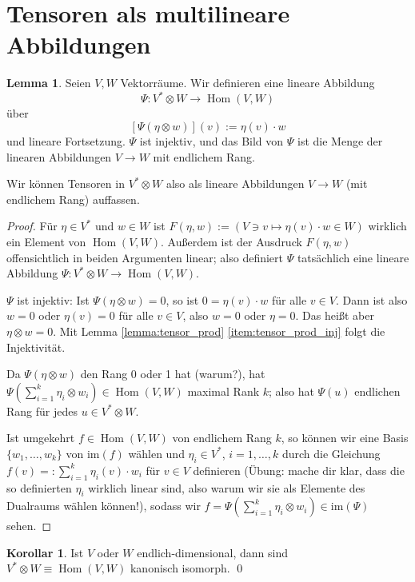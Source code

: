 \documentclass[a4paper]{scrbook}
\numberwithin{equation}{chapter}
\DeclareMathOperator{\Hom}{Hom}
\theoremstyle{definition}
\newtheorem{lemma}[defn]{Lemma}
\newtheorem{kor}[defn]{Korollar}
\begin{document}
\section{Tensoren als multilineare Abbildungen}

\begin{lemma}
	Seien $V,W$ Vektorräume. Wir definieren eine lineare Abbildung
	\[\Psi\colon V^*\otimes W \to \Hom(V,W)\]
	über
	\[[\Psi(\eta\otimes w)](v) := \eta(v) \cdot w\]
	und lineare Fortsetzung. $\Psi$ ist injektiv, und das Bild von $\Psi$ ist die Menge der linearen Abbildungen $V\to W$ mit endlichem Rang.

	Wir können Tensoren in $V^*\otimes W$ also als lineare Abbildungen $V\to W$ (mit endlichem Rang) auffassen.

	\begin{proof}
		Für $\eta \in V^*$ und $w\in W$ ist $F(\eta,w) := (V \ni v \mapsto \eta(v) \cdot w \in W)$ wirklich ein Element von $\Hom(V,W)$. Außerdem ist der Ausdruck $F(\eta,w)$ offensichtlich in beiden Argumenten linear; also definiert $\Psi$ tatsächlich eine lineare Abbildung $\Psi\colon V^*\otimes W \to \Hom(V,W)$.

		$\Psi$ ist injektiv: Ist $\Psi(\eta \otimes w) = 0$, so ist $0 = \eta(v) \cdot w$ für alle $v\in V$. Dann ist also $w=0$ oder $\eta(v) = 0$ für alle $v\in V$, also $w=0$ oder $\eta=0$. Das heißt aber $\eta \otimes w = 0$. Mit Lemma \ref{lemma:tensor_prod} \ref{item:tensor_prod_inj} folgt die Injektivität.

		Da $\Psi(\eta\otimes w)$ den Rang 0 oder 1 hat (warum?), hat $\Psi\left(\sum_{i=1}^k \eta_i \otimes w_i\right) \in \Hom(V,W)$ maximal Rank $k$; also hat $\Psi(u)$ endlichen Rang für jedes $u\in V^*\otimes W$.

		Ist umgekehrt $f\in\Hom(V,W)$ von endlichem Rang $k$, so können wir eine Basis $\{w_1,\dots,w_k\}$ von $\mathrm{im}(f)$ wählen und $\eta_i \in V^*$, $i=1,\dots,k$ durch die Gleichung $f(v) =: \sum_{i=1}^k \eta_i(v) \cdot w_i$ für $v\in V$ definieren (Übung: mache dir klar, dass die so definierten $\eta_i$ wirklich linear sind, also warum wir sie als Elemente des Dualraums wählen können!), sodass wir $f = \Psi\left(\sum_{i=1}^k \eta_i \otimes w_i\right) \in \mathrm{im}(\Psi)$ sehen.
	\end{proof}
\end{lemma}
\begin{kor}
	Ist $V$ oder $W$ endlich-dimensional, dann sind $V^* \otimes W \equiv \Hom(V,W)$ kanonisch isomorph. \qed
\end{kor}
\end{document}
